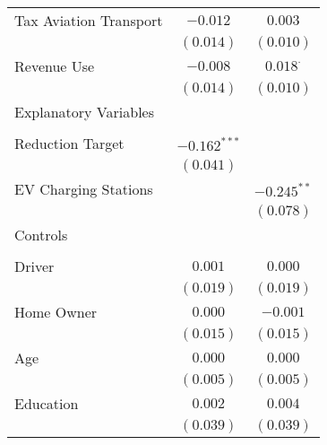\begin{center}
\begin{tiny}
\begin{longtable}{l@{} c@{} c@{}}
\quad Tax Aviation Transport                           & $-0.012$         & $0.003$          \\
                                                       & $(0.014)$        & $(0.010)$        \\
\quad Revenue Use                                      & $-0.008$         & $0.018^{\cdot}$  \\
                                                       & $(0.014)$        & $(0.010)$        \\
Explanatory Variables                                  &                  &                  \\
                                                       &                  &                  \\
\quad Reduction Target                                 & $-0.162^{***}$   &                  \\
                                                       & $(0.041)$        &                  \\
\quad EV Charging Stations                             &                  & $-0.245^{**}$    \\
                                                       &                  & $(0.078)$        \\
Controls                                               &                  &                  \\
                                                       &                  &                  \\
\quad Driver                                           & $0.001$          & $0.000$          \\
                                                       & $(0.019)$        & $(0.019)$        \\
\quad Home Owner                                       & $0.000$          & $-0.001$         \\
                                                       & $(0.015)$        & $(0.015)$        \\
\quad Age                                              & $0.000$          & $0.000$          \\
                                                       & $(0.005)$        & $(0.005)$        \\
\quad Education                                        & $0.002$          & $0.004$          \\
                                                       & $(0.039)$        & $(0.039)$        \\

\end{longtable}
\end{tiny}
\end{center}
